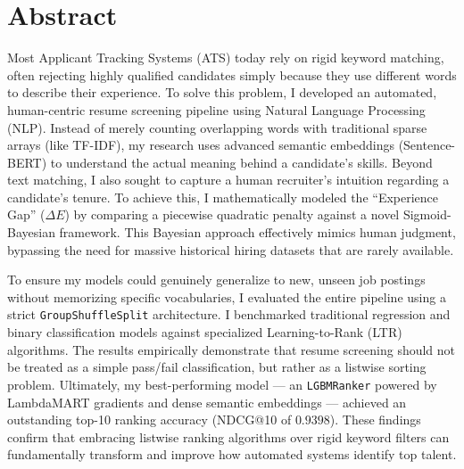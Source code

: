 \chapter*{Abstract}

Most Applicant Tracking Systems (ATS) today rely on rigid keyword matching, often rejecting highly qualified candidates simply because they use different words to describe their experience. To solve this problem, I developed an automated, human-centric resume screening pipeline using Natural Language Processing (NLP). Instead of merely counting overlapping words with traditional sparse arrays (like TF-IDF), my research uses advanced semantic embeddings (Sentence-BERT) to understand the actual meaning behind a candidate's skills. Beyond text matching, I also sought to capture a human recruiter's intuition regarding a candidate's tenure. To achieve this, I mathematically modeled the ``Experience Gap'' ($\Delta E$) by comparing a piecewise quadratic penalty against a novel Sigmoid-Bayesian framework. This Bayesian approach effectively mimics human judgment, bypassing the need for massive historical hiring datasets that are rarely available.

To ensure my models could genuinely generalize to new, unseen job postings without memorizing specific vocabularies, I evaluated the entire pipeline using a strict \texttt{GroupShuffleSplit} architecture. I benchmarked traditional regression and binary classification models against specialized Learning-to-Rank (LTR) algorithms. The results empirically demonstrate that resume screening should not be treated as a simple pass/fail classification, but rather as a listwise sorting problem. Ultimately, my best-performing model --- an \texttt{LGBMRanker} powered by LambdaMART gradients and dense semantic embeddings --- achieved an outstanding top-10 ranking accuracy (NDCG@10 of $0.9398$). These findings confirm that embracing listwise ranking algorithms over rigid keyword filters can fundamentally transform and improve how automated systems identify top talent.
